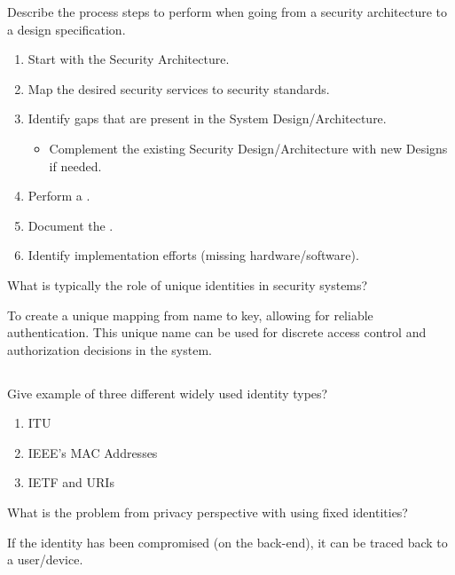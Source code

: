 \begin{questions}
\question{} Describe the process steps to perform when going from a security architecture to a design specification.
  \begin{solution}
    \begin{enumerate}[noitemsep]
    \item Start with the Security Architecture.
    \item Map the desired security services to security standards.
    \item Identify gaps that are present in the System Design/Architecture.
      \begin{itemize}[noitemsep]
      \item Complement the existing Security Design/Architecture with new Designs if needed.
      \end{itemize}
    \item Perform a .
    \item Document the .
    \item Identify implementation efforts (missing hardware/software).
    \end{enumerate}
  \end{solution}

\question{} What is typically the role of unique identities in security systems?
  \begin{solution}
    To create a unique mapping from name to key, allowing for reliable authentication.
    This unique name can be used for discrete access control and authorization decisions in the system.
  \end{solution}

  \begin{parts}
  \part{} Give example of three different widely used identity types?
    \begin{solution}
      \begin{enumerate}[noitemsep]
      \item ITU
      \item IEEE's MAC Addresses
      \item IETF and URIs
      \end{enumerate}
    \end{solution}
  \end{parts}

\question{} What is the problem from privacy perspective with using fixed identities?
  \begin{solution}
    If the identity has been compromised (on the back-end), it can be traced back to a user/device.
  \end{solution}


\end{questions}
